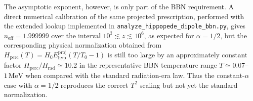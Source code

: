 \documentclass[preprint,12pt]{elsarticle}
\begin{document}
The asymptotic exponent, however, is only part of the BBN requirement. A direct numerical calibration of the same projected prescription, performed with the extended lookup implemented in \texttt{analyze\_hippopede\_dipole\_bbn.py}, gives $n_{\mathrm{eff}}=1.999999$ over the interval $10^3\lesssim z\lesssim10^6$, as expected for $\alpha=1/2$, but the corresponding physical normalization obtained from $H_{\mathrm{perc}}(T)=H_0E_{\mathrm{hyp}}^{\mathrm{proj}}(T/T_0-1)$ is still too large by an approximately constant factor $H_{\mathrm{perc}}/H_{\mathrm{rad}}\simeq10.2$ in the representative BBN temperature range $T\simeq0.07$--$1\,\mathrm{MeV}$ when compared with the standard radiation-era law. Thus the constant-$\alpha$ case with $\alpha=1/2$ reproduces the correct $T^2$ scaling but not yet the standard normalization.
\end{document}
